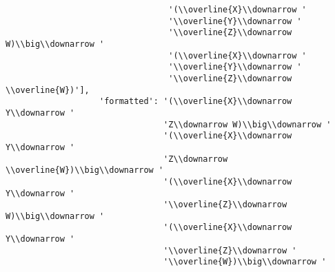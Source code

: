 \begin{verbatim}
                                 '(\\overline{X}\\downarrow '
                                 '\\overline{Y}\\downarrow '
                                 '\\overline{Z}\\downarrow W)\\big\\downarrow '
                                 '(\\overline{X}\\downarrow '
                                 '\\overline{Y}\\downarrow '
                                 '\\overline{Z}\\downarrow \\overline{W})'],
                   'formatted': '(\\overline{X}\\downarrow Y\\downarrow '
                                'Z\\downarrow W)\\big\\downarrow '
                                '(\\overline{X}\\downarrow Y\\downarrow '
                                'Z\\downarrow \\overline{W})\\big\\downarrow '
                                '(\\overline{X}\\downarrow Y\\downarrow '
                                '\\overline{Z}\\downarrow W)\\big\\downarrow '
                                '(\\overline{X}\\downarrow Y\\downarrow '
                                '\\overline{Z}\\downarrow '
                                '\\overline{W})\\big\\downarrow '

\end{verbatim}

